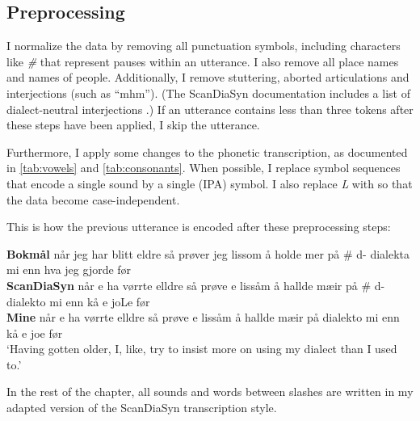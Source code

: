 \subsection{Preprocessing}
\label{sec:dialects-preprocessing}


I normalize the data by removing all punctuation symbols, including characters like \textit{\#} that represent pauses within an utterance.
I also remove all place names and names of people.
Additionally, I remove stuttering, aborted articulations and interjections (such as ``mhm'').
(The ScanDiaSyn documentation includes a list of dialect-neutral interjections \cite[p.~30]{johannessen2009transkripsjonsrettleiing}.)
If an utterance contains less than three tokens after these steps have been applied, I skip the utterance.

Furthermore, I apply some changes to the phonetic transcription, as documented in \autoref{tab:vowels} and \autoref{tab:consonants}.
When possible, I replace symbol sequences that encode a single sound by a single (IPA) symbol.
I also replace \textit{L} with \textit{\textrtailr} so that the data become case-independent.

This is how the previous utterance is encoded after these preprocessing steps:


\renewcommand{\eachwordtwo}{}
\begin{exe}
\ex 
\glll
\textbf{Bokmål} når jeg har blitt eldre så prøver jeg lissom å holde mer på \# d- dialekta mi enn hva jeg gjorde før\\
\textbf{ScanDiaSyn} når e ha vørrte elldre så prøve e lissåm å hallde mæir på \# d- dialekto mi enn kå e joLe før\\
\textbf{Mine} når e ha vørrte elldre så prøve e lissåm å hallde mæir på {} {} dialekto mi enn kå e jo{\textrtailr}e før\\
\trans `Having gotten older, I, like, try to insist more on using my dialect than I used to.'
\label{gloss:preprocessing}
\end{exe}
\renewcommand{\eachwordtwo}{\rule[-10pt]{0pt}{0pt}}

In the rest of the chapter, all sounds and words between slashes are written in my adapted version of the ScanDiaSyn transcription style.
